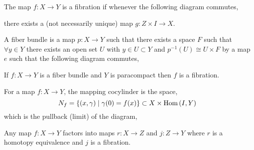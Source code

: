 \documentclass[12pt]{extarticle}
\begin{document}
\begin{definition}
The map $f : X \to Y$ is a fibration if whenever the following diagram commutes,
\begin{center}
\end{center}
there exists a (not necessarily unique) map $g: Z \times I \to X$. 
\end{definition}

\begin{definition}
A fiber bundle is a map $p : X \to Y$ such that there exists a space $F$ such that $\forall y \in Y$ there exists an open set $U$ with $y \in U \subset Y$ and $p^{-1}(U) \cong U \times F$ by a map $e$ such that the following diagram commutes,
\begin{center}
\end{center}
\end{definition}

\begin{theorem}
If $f : X \to Y$ is a fiber bundle and $Y$ is paracompact then $f$ is a fibration.
\end{theorem}


\begin{definition}
For a map $f : X \to Y$, the mapping cocylinder is the space,
\[ N_f  = \{(x, \gamma) \mid \gamma(0) = f(x) \} \subset X \times \mathrm{Hom}\left( I, Y \right) \]
which is the pullback (limit) of the diagram,
\begin{center}
\end{center}  
\end{definition}

\begin{lemma}
Any map $f : X \to Y$ factors into maps $r : X \to Z$ and $j : Z \to Y$ where $r$ is a homotopy equivalence and $j$ is a fibration.
\end{lemma}
\end{document}
